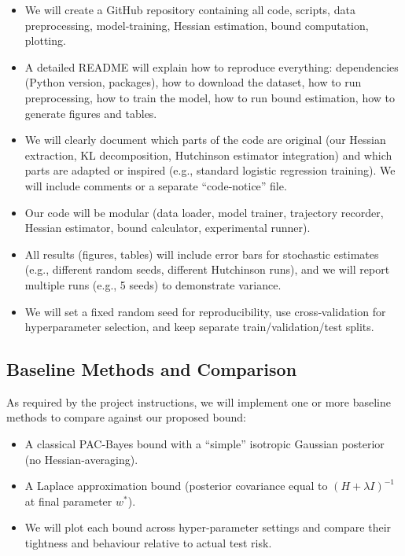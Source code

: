 \begin{itemize}[noitemsep]
  \item We will create a GitHub repository containing all code, scripts, data preprocessing, model‐training, Hessian estimation, bound computation, plotting.  
  \item A detailed README will explain how to reproduce everything: dependencies (Python version, packages), how to download the dataset, how to run preprocessing, how to train the model, how to run bound estimation, how to generate figures and tables.  
  \item We will clearly document which parts of the code are original (our Hessian extraction, KL decomposition, Hutchinson estimator integration) and which parts are adapted or inspired (e.g., standard logistic regression training). We will include comments or a separate “code‑notice” file.  
  \item Our code will be modular (data loader, model trainer, trajectory recorder, Hessian estimator, bound calculator, experimental runner).  
  \item All results (figures, tables) will include error bars for stochastic estimates (e.g., different random seeds, different Hutchinson runs), and we will report multiple runs (e.g., 5 seeds) to demonstrate variance.  
  \item We will set a fixed random seed for reproducibility, use cross‐validation for hyperparameter selection, and keep separate train/validation/test splits.  
\end{itemize}

\subsection{Baseline Methods and Comparison}

As required by the project instructions, we will implement one or more baseline methods to compare against our proposed bound:

\begin{itemize}[noitemsep]
  \item A classical PAC‐Bayes bound with a “simple” isotropic Gaussian posterior (no Hessian‐averaging).  
  \item A Laplace approximation bound (posterior covariance equal to \((H + \lambda I)^{-1}\) at final parameter \(w^*\)).  
  \item We will plot each bound across hyper‐parameter settings and compare their tightness and behaviour relative to actual test risk.  
\end{itemize}

